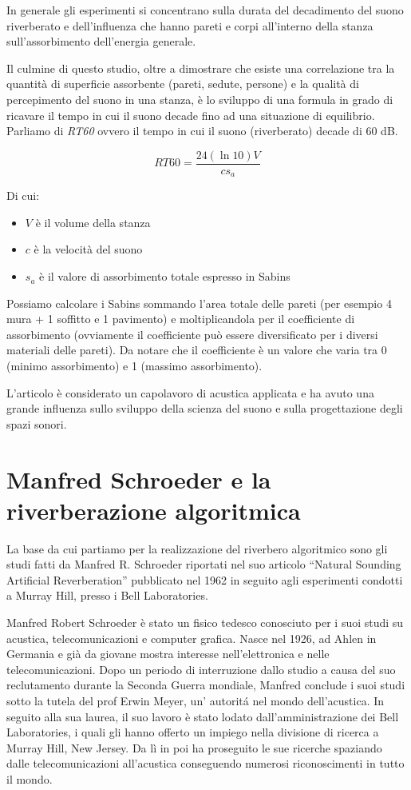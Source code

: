 In generale gli esperimenti si concentrano sulla durata del decadimento del suono riverberato e dell’influenza che hanno pareti e corpi all’interno della stanza sull’assorbimento dell’energia generale.

Il culmine di questo studio, oltre a dimostrare che esiste una correlazione tra la quantità di superficie assorbente (pareti, sedute, persone) e la qualità di percepimento del suono in una stanza, è lo sviluppo di una formula in grado di ricavare il tempo in cui il suono decade fino ad una situazione di equilibrio.
Parliamo di \emph{RT60} ovvero il tempo in cui il suono (riverberato) decade di 60 dB.

\begin{equation}
RT60 = \frac{24(\ln{10})V}{c s_a}
\end{equation}

Di cui:
\begin{itemize}
\item $V$ è il volume della stanza
\item $c$ è la velocità del suono
\item $s_a$ è il valore di assorbimento totale espresso in Sabins
\end{itemize}

Possiamo calcolare i Sabins sommando l’area totale delle pareti (per esempio 4 mura + 1 soffitto e 1 pavimento) e moltiplicandola per il coefficiente di assorbimento (ovviamente il coefficiente può essere diversificato per i diversi materiali delle pareti). Da notare che il coefficiente è un valore che varia tra 0 (minimo assorbimento) e 1 (massimo assorbimento).

L’articolo è considerato un capolavoro di acustica applicata e ha avuto una grande influenza sullo sviluppo della scienza del suono e sulla progettazione degli spazi sonori.

\section{Manfred Schroeder e la riverberazione algoritmica}

La base da cui partiamo per la realizzazione del riverbero algoritmico sono gli studi fatti da Manfred R. Schroeder riportati nel suo articolo “Natural Sounding Artificial Reverberation” pubblicato nel 1962 in seguito agli esperimenti condotti a Murray Hill, presso i Bell Laboratories.

Manfred Robert Schroeder è stato un fisico tedesco conosciuto per i suoi studi su acustica, telecomunicazioni e computer grafica. Nasce nel 1926, ad Ahlen in Germania e già da giovane mostra interesse nell’elettronica e nelle telecomunicazioni. Dopo un periodo di interruzione dallo studio a causa del suo reclutamento durante la Seconda Guerra mondiale, Manfred conclude i suoi studi sotto la tutela del prof Erwin Meyer, un’ autoritá nel mondo dell’acustica.
In seguito alla sua laurea, il suo lavoro è stato lodato dall’amministrazione dei Bell Laboratories, i quali gli hanno offerto un impiego nella divisione di ricerca a Murray Hill, New Jersey. Da lì in poi ha proseguito le sue ricerche spaziando dalle telecomunicazioni all’acustica conseguendo numerosi riconoscimenti in tutto il mondo.

